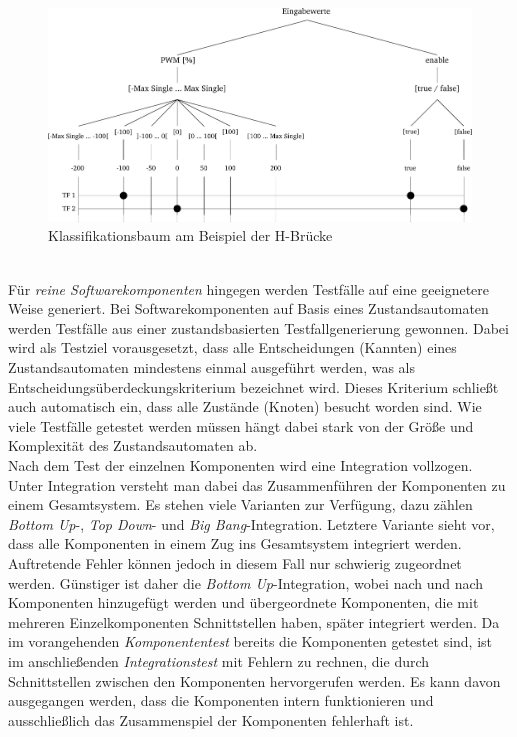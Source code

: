 \begin{figure}%
\includegraphics[width=\columnwidth]{./Bilder/fig_klass}%
\caption{Klassifikationsbaum am Beispiel der H-Brücke}%
\label{fig_klass}%
\end{figure}
\\
Für \textit{reine Softwarekomponenten} hingegen werden Testfälle auf eine geeignetere Weise generiert. Bei Softwarekomponenten auf Basis eines Zustandsautomaten werden Testfälle aus einer zustandsbasierten Testfallgenerierung gewonnen. Dabei wird als Testziel vorausgesetzt, dass alle Entscheidungen (Kannten) eines Zustandsautomaten mindestens einmal ausgeführt werden, was als Entscheidungsüberdeckungskriterium bezeichnet wird. Dieses Kriterium schließt auch automatisch ein, dass alle Zustände (Knoten) besucht worden sind. Wie viele Testfälle getestet werden müssen hängt dabei stark von der Größe und Komplexität des Zustandsautomaten ab.\\
Nach dem Test der einzelnen Komponenten wird eine Integration vollzogen. Unter Integration versteht man dabei das Zusammenführen der Komponenten zu einem Gesamtsystem. Es stehen viele Varianten zur Verfügung, dazu zählen \textit{Bottom Up}-, \textit{Top Down}- und \textit{Big Bang}-Integration. Letztere Variante sieht vor, dass alle Komponenten in einem Zug ins Gesamtsystem integriert werden. Auftretende Fehler können jedoch in diesem Fall nur schwierig zugeordnet werden. Günstiger ist daher die \textit{Bottom Up}-Integration, wobei nach und nach Komponenten hinzugefügt werden und übergeordnete Komponenten, die mit mehreren Einzelkomponenten Schnittstellen haben, später integriert werden. Da im vorangehenden \textit{Komponententest} bereits die Komponenten getestet sind, ist im anschließenden \textit{Integrationstest} mit Fehlern zu rechnen, die durch Schnittstellen zwischen den Komponenten hervorgerufen werden. Es kann davon ausgegangen werden, dass die Komponenten intern funktionieren und ausschließlich das Zusammenspiel der Komponenten fehlerhaft ist. \\

